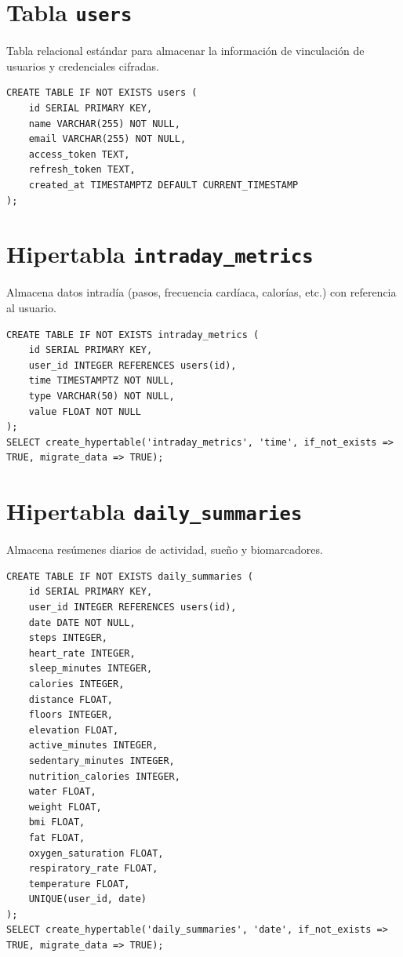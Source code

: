 \section*{Tabla \texttt{users}}
Tabla relacional estándar para almacenar la información de vinculación de usuarios y credenciales cifradas.

\begin{verbatim}
CREATE TABLE IF NOT EXISTS users (
    id SERIAL PRIMARY KEY,
    name VARCHAR(255) NOT NULL,
    email VARCHAR(255) NOT NULL,
    access_token TEXT,
    refresh_token TEXT,
    created_at TIMESTAMPTZ DEFAULT CURRENT_TIMESTAMP
);
\end{verbatim}

\section*{Hipertabla \texttt{intraday\_metrics}}
Almacena datos intradía (pasos, frecuencia cardíaca, calorías, etc.) con referencia al usuario.

\begin{verbatim}
CREATE TABLE IF NOT EXISTS intraday_metrics (
    id SERIAL PRIMARY KEY,
    user_id INTEGER REFERENCES users(id),
    time TIMESTAMPTZ NOT NULL,
    type VARCHAR(50) NOT NULL,
    value FLOAT NOT NULL
);
SELECT create_hypertable('intraday_metrics', 'time', if_not_exists => TRUE, migrate_data => TRUE);
\end{verbatim}

\section*{Hipertabla \texttt{daily\_summaries}}
Almacena resúmenes diarios de actividad, sueño y biomarcadores.

\begin{verbatim}
CREATE TABLE IF NOT EXISTS daily_summaries (
    id SERIAL PRIMARY KEY,
    user_id INTEGER REFERENCES users(id),
    date DATE NOT NULL,
    steps INTEGER,
    heart_rate INTEGER,
    sleep_minutes INTEGER,
    calories INTEGER,
    distance FLOAT,
    floors INTEGER,
    elevation FLOAT,
    active_minutes INTEGER,
    sedentary_minutes INTEGER,
    nutrition_calories INTEGER,
    water FLOAT,
    weight FLOAT,
    bmi FLOAT,
    fat FLOAT,
    oxygen_saturation FLOAT,
    respiratory_rate FLOAT,
    temperature FLOAT,
    UNIQUE(user_id, date)
);
SELECT create_hypertable('daily_summaries', 'date', if_not_exists => TRUE, migrate_data => TRUE);
\end{verbatim}

